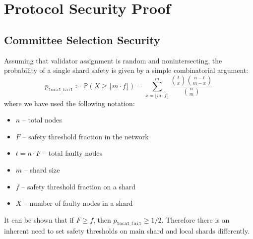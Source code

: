 \section{Protocol Security Proof}
\label{appendix:security}

\subsection{Committee Selection Security}
\label{appendix:committee-selection-security}

Assuming that validator assignment is random and nonintersecting, the probability of a single shard safety is given by a simple combinatorial argument:
$$
p_{\texttt{local\_fail}} \coloneqq
\mathbb{P}\left(X \geq\lfloor m \cdot f \rfloor \right) = 
\sum_{x=\lfloor m \cdot f \rfloor}^m 
\frac{\binom{t}{x} \binom{n-t}{m-x}}{\binom{n}{m}}
$$
where we have used the following notation:
\begin{itemize}
    \item $n$ -- total nodes
    \item $F$ -- safety threshold fraction in the network
    \item $t = n \cdot F$ -- total faulty nodes
    \item $m$ -- shard size
    \item $f$ -- safety threshold fraction on a shard
    \item $X$ -- number of faulty nodes in a shard
\end{itemize}

It can be shown that if $F \geq f$, then $p_{\texttt{local\_fail}} \geq 1/2$.
Therefore there is an inherent need to set safety thresholds on main shard and local shards differently.
